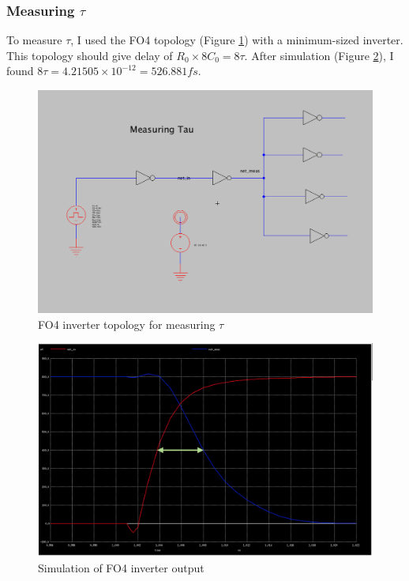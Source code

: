 \documentclass{article}
\begin{document}
\subsubsection{Measuring $\tau$}
To measure $\tau$, I used the FO4 topology (Figure \ref{fig:inv_fo4_sch}) with a minimum-sized inverter. This topology should give delay of $R_0 \times 8C_0 = 8\tau$. After simulation (Figure \ref{fig:inv_fo4_sim}), I found $8\tau = 4.21505\times 10^{-12} = 526.881fs$.

\begin{figure}[H]
  \includegraphics[width=\linewidth]{opt_screenshots/inv_fo4_sch.png}
  \caption{FO4 inverter topology for measuring $\tau$}
  \label{fig:inv_fo4_sch}
\end{figure}

\begin{figure}[H]
  \includegraphics[width=\linewidth]{opt_screenshots/inv_fo4_sim.png}
  \caption{Simulation of FO4 inverter output}
  \label{fig:inv_fo4_sim}
\end{figure}
\end{document}
